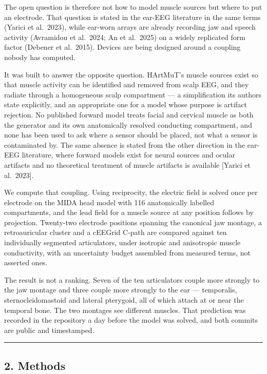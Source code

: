 \documentclass[
  11pt,
  a4paper,
]{article}
\newcounter{none} %
\begin{document}
The open question is therefore not how to model muscle sources but where to
put an electrode. That question is stated in the ear-EEG literature in the
same terms (Yarici et al.~2023), while ear-worn arrays are already recording
jaw and speech activity (Avramidou et al.~2024; An et al.~2025) on a widely
replicated form factor (Debener et al.~2015). Devices are being designed
around a coupling nobody has computed.

It was built to answer the opposite question. HArtMuT's muscle sources exist so
that muscle activity can be identified and removed from scalp EEG, and they
radiate through a homogeneous scalp compartment --- a simplification its authors
state explicitly, and an appropriate one for a model whose purpose is artifact
rejection. No published forward model treats facial and cervical muscle as both
the generator and its own anatomically resolved conducting compartment, and none
has been used to ask where a sensor should be placed, not what a sensor is
contaminated by. The same absence is stated from the other direction in the
ear-EEG literature, where forward models exist for neural sources and ocular
artifacts and no theoretical treatment of muscle artifacts is available {[}Yarici
et al.~2023{]}.

We compute that coupling. Using reciprocity, the electric field is solved once
per electrode on the MIDA head model with 116 anatomically labelled
compartments, and the lead field for a muscle source at any position follows by
projection. Twenty-two electrode positions spanning the canonical jaw montage, a
retroauricular cluster and a cEEGrid C-path are compared against ten
individually segmented articulators, under isotropic and anisotropic muscle
conductivity, with an uncertainty budget assembled from measured terms, not
asserted ones.

The result is not a ranking. Seven of the ten articulators couple more strongly
to the jaw montage and three couple more strongly to the ear --- temporalis,
sternocleidomastoid and lateral pterygoid, all of which attach at or near the
temporal bone. The two montages see different muscles. That prediction was
recorded in the repository a day before the model was solved, and both commits
are public and timestamped.

\begin{center}\rule{0.5\linewidth}{0.5pt}\end{center}

\subsection{2. Methods}\label{methods}
\end{document}
